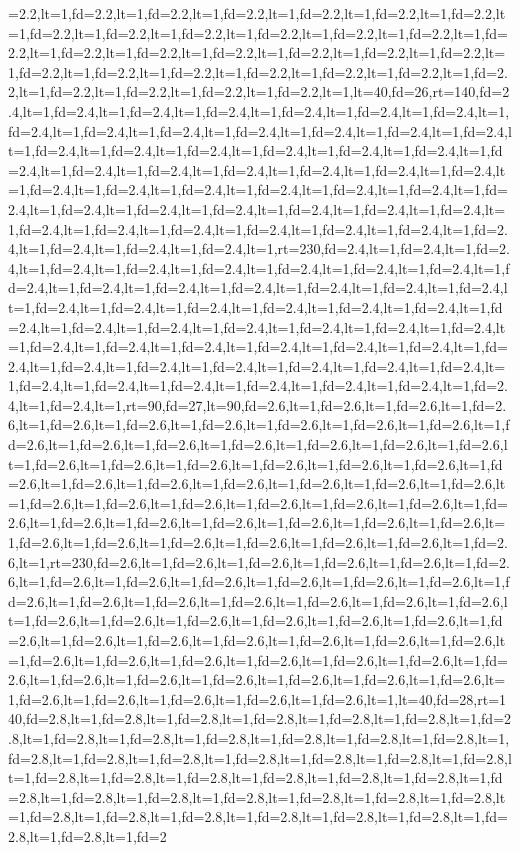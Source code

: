 \documentclass[a4paper,10pt]{article}
\begin{document}
=2.2,lt=1,fd=2.2,lt=1,fd=2.2,lt=1,fd=2.2,lt=1,fd=2.2,lt=1,fd=2.2,lt=1,fd=2.2,lt=1,fd=2.2,lt=1,fd=2.2,lt=1,fd=2.2,lt=1,fd=2.2,lt=1,fd=2.2,lt=1,fd=2.2,lt=1,fd=2.2,lt=1,fd=2.2,lt=1,fd=2.2,lt=1,fd=2.2,lt=1,fd=2.2,lt=1,fd=2.2,lt=1,fd=2.2,lt=1,fd=2.2,lt=1,fd=2.2,lt=1,fd=2.2,lt=1,fd=2.2,lt=1,fd=2.2,lt=1,fd=2.2,lt=1,fd=2.2,lt=1,fd=2.2,lt=1,fd=2.2,lt=1,fd=2.2,lt=1,fd=2.2,lt=1,lt=40,fd=26,rt=140,fd=2.4,lt=1,fd=2.4,lt=1,fd=2.4,lt=1,fd=2.4,lt=1,fd=2.4,lt=1,fd=2.4,lt=1,fd=2.4,lt=1,fd=2.4,lt=1,fd=2.4,lt=1,fd=2.4,lt=1,fd=2.4,lt=1,fd=2.4,lt=1,fd=2.4,lt=1,fd=2.4,lt=1,fd=2.4,lt=1,fd=2.4,lt=1,fd=2.4,lt=1,fd=2.4,lt=1,fd=2.4,lt=1,fd=2.4,lt=1,fd=2.4,lt=1,fd=2.4,lt=1,fd=2.4,lt=1,fd=2.4,lt=1,fd=2.4,lt=1,fd=2.4,lt=1,fd=2.4,lt=1,fd=2.4,lt=1,fd=2.4,lt=1,fd=2.4,lt=1,fd=2.4,lt=1,fd=2.4,lt=1,fd=2.4,lt=1,fd=2.4,lt=1,fd=2.4,lt=1,fd=2.4,lt=1,fd=2.4,lt=1,fd=2.4,lt=1,fd=2.4,lt=1,fd=2.4,lt=1,fd=2.4,lt=1,fd=2.4,lt=1,fd=2.4,lt=1,fd=2.4,lt=1,fd=2.4,lt=1,fd=2.4,lt=1,fd=2.4,lt=1,fd=2.4,lt=1,fd=2.4,lt=1,fd=2.4,lt=1,rt=230,fd=2.4,lt=1,fd=2.4,lt=1,fd=2.4,lt=1,fd=2.4,lt=1,fd=2.4,lt=1,fd=2.4,lt=1,fd=2.4,lt=1,fd=2.4,lt=1,fd=2.4,lt=1,fd=2.4,lt=1,fd=2.4,lt=1,fd=2.4,lt=1,fd=2.4,lt=1,fd=2.4,lt=1,fd=2.4,lt=1,fd=2.4,lt=1,fd=2.4,lt=1,fd=2.4,lt=1,fd=2.4,lt=1,fd=2.4,lt=1,fd=2.4,lt=1,fd=2.4,lt=1,fd=2.4,lt=1,fd=2.4,lt=1,fd=2.4,lt=1,fd=2.4,lt=1,fd=2.4,lt=1,fd=2.4,lt=1,fd=2.4,lt=1,fd=2.4,lt=1,fd=2.4,lt=1,fd=2.4,lt=1,fd=2.4,lt=1,fd=2.4,lt=1,fd=2.4,lt=1,fd=2.4,lt=1,fd=2.4,lt=1,fd=2.4,lt=1,fd=2.4,lt=1,fd=2.4,lt=1,fd=2.4,lt=1,fd=2.4,lt=1,fd=2.4,lt=1,fd=2.4,lt=1,fd=2.4,lt=1,fd=2.4,lt=1,fd=2.4,lt=1,fd=2.4,lt=1,fd=2.4,lt=1,fd=2.4,lt=1,rt=90,fd=27,lt=90,fd=2.6,lt=1,fd=2.6,lt=1,fd=2.6,lt=1,fd=2.6,lt=1,fd=2.6,lt=1,fd=2.6,lt=1,fd=2.6,lt=1,fd=2.6,lt=1,fd=2.6,lt=1,fd=2.6,lt=1,fd=2.6,lt=1,fd=2.6,lt=1,fd=2.6,lt=1,fd=2.6,lt=1,fd=2.6,lt=1,fd=2.6,lt=1,fd=2.6,lt=1,fd=2.6,lt=1,fd=2.6,lt=1,fd=2.6,lt=1,fd=2.6,lt=1,fd=2.6,lt=1,fd=2.6,lt=1,fd=2.6,lt=1,fd=2.6,lt=1,fd=2.6,lt=1,fd=2.6,lt=1,fd=2.6,lt=1,fd=2.6,lt=1,fd=2.6,lt=1,fd=2.6,lt=1,fd=2.6,lt=1,fd=2.6,lt=1,fd=2.6,lt=1,fd=2.6,lt=1,fd=2.6,lt=1,fd=2.6,lt=1,fd=2.6,lt=1,fd=2.6,lt=1,fd=2.6,lt=1,fd=2.6,lt=1,fd=2.6,lt=1,fd=2.6,lt=1,fd=2.6,lt=1,fd=2.6,lt=1,fd=2.6,lt=1,fd=2.6,lt=1,fd=2.6,lt=1,fd=2.6,lt=1,fd=2.6,lt=1,rt=230,fd=2.6,lt=1,fd=2.6,lt=1,fd=2.6,lt=1,fd=2.6,lt=1,fd=2.6,lt=1,fd=2.6,lt=1,fd=2.6,lt=1,fd=2.6,lt=1,fd=2.6,lt=1,fd=2.6,lt=1,fd=2.6,lt=1,fd=2.6,lt=1,fd=2.6,lt=1,fd=2.6,lt=1,fd=2.6,lt=1,fd=2.6,lt=1,fd=2.6,lt=1,fd=2.6,lt=1,fd=2.6,lt=1,fd=2.6,lt=1,fd=2.6,lt=1,fd=2.6,lt=1,fd=2.6,lt=1,fd=2.6,lt=1,fd=2.6,lt=1,fd=2.6,lt=1,fd=2.6,lt=1,fd=2.6,lt=1,fd=2.6,lt=1,fd=2.6,lt=1,fd=2.6,lt=1,fd=2.6,lt=1,fd=2.6,lt=1,fd=2.6,lt=1,fd=2.6,lt=1,fd=2.6,lt=1,fd=2.6,lt=1,fd=2.6,lt=1,fd=2.6,lt=1,fd=2.6,lt=1,fd=2.6,lt=1,fd=2.6,lt=1,fd=2.6,lt=1,fd=2.6,lt=1,fd=2.6,lt=1,fd=2.6,lt=1,fd=2.6,lt=1,fd=2.6,lt=1,fd=2.6,lt=1,fd=2.6,lt=1,lt=40,fd=28,rt=140,fd=2.8,lt=1,fd=2.8,lt=1,fd=2.8,lt=1,fd=2.8,lt=1,fd=2.8,lt=1,fd=2.8,lt=1,fd=2.8,lt=1,fd=2.8,lt=1,fd=2.8,lt=1,fd=2.8,lt=1,fd=2.8,lt=1,fd=2.8,lt=1,fd=2.8,lt=1,fd=2.8,lt=1,fd=2.8,lt=1,fd=2.8,lt=1,fd=2.8,lt=1,fd=2.8,lt=1,fd=2.8,lt=1,fd=2.8,lt=1,fd=2.8,lt=1,fd=2.8,lt=1,fd=2.8,lt=1,fd=2.8,lt=1,fd=2.8,lt=1,fd=2.8,lt=1,fd=2.8,lt=1,fd=2.8,lt=1,fd=2.8,lt=1,fd=2.8,lt=1,fd=2.8,lt=1,fd=2.8,lt=1,fd=2.8,lt=1,fd=2.8,lt=1,fd=2.8,lt=1,fd=2.8,lt=1,fd=2.8,lt=1,fd=2.8,lt=1,fd=2.8,lt=1,fd=2.8,lt=1,fd=2.8,lt=1,fd=2
\end{document}

